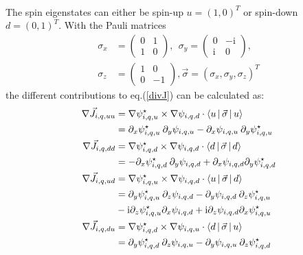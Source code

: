 \documentclass[4p]{elsarticle}
\begin{document}
\begin{itemize}
\begin{align}
\end{align}
The spin eigenstates can either be spin-up $u = (1,0)^T$ or spin-down $d = (0,1)^T$. With the Pauli matrices
\begin{align}
\sigma_x & =  \begin{pmatrix} 0 & 1  \\ 1 & 0 \end{pmatrix}, \: \: \sigma_y =  \begin{pmatrix} 0 & -\mathrm{i}  \\ \mathrm{i} & 0 \end{pmatrix}, \nonumber\\ 
\sigma_z &=  \begin{pmatrix} 1 & 0  \\ 0 & -1 \end{pmatrix}, \vec{\sigma}  = (\sigma_x, \sigma_y, \sigma_z)^T \nonumber
\end{align}
 the different contributions to eq.(\ref{divJ}) can be calculated as:
\begin{align}
 \nabla \vec{J}_{i,q,uu}  &=  \nabla \psi_{i,q,u}^\star \times \nabla \psi_{i,q,d} \cdot \Braket{ u  | \vec{\sigma} | u } \\
&=   \partial_x \psi_{i,q,u}^\star \: \partial_y \psi_{i,q,u} - \partial_x \psi_{i,q,u} \: \partial_y \psi_{i,q,u}^\star  \label{12terms_i}\nonumber\\
\nabla \vec{J}_{i,q,dd} &= \nabla \psi_{i,q,d}^\star \times \nabla \psi_{i,q,d} \cdot \Braket{ d  | \vec{\sigma} | d } \\
& =  - \partial_x \psi_{i,q,d}^\star \: \partial_y \psi_{i,q,d} + \partial_x \psi_{i,q,d} \partial_y \psi_{i,q,d}^\star \nonumber\\
 \nabla \vec{J}_{i,q,ud} &= \nabla \psi_{i,q,u}^\star \times \nabla \psi_{i,q,d} \cdot \Braket{ u  | \vec{\sigma} | d } \\
&=  \partial_y \psi_{i,q,u}^\star \: \partial_z \psi_{i,q,d} - \partial_y \psi_{i,q,d} \: \partial_z \psi_{i,q,u}^\star  \nonumber\\
& - \mathrm{i} \partial_z  \psi_{i,q,u}^\star \partial_x \psi_{i,q,d} + \mathrm{i} \partial_z \psi_{i,q,d}  \partial_x  \psi_{i,q,u}^\star \nonumber\\
 \nabla \vec{J}_{i,q,du} &= \nabla \psi_{i,q,d}^\star \times \nabla \psi_{i,q,u} \cdot \Braket{ d  | \vec{\sigma} | u } \\
&=  \partial_y \psi_{i,q,d}^\star \: \partial_z \psi_{i,q,u} -  \partial_y \psi_{i,q,u} \: \partial_z \psi_{i,q,d}^\star \nonumber\\ 

\end{align}
\end{itemize}
\end{document}
